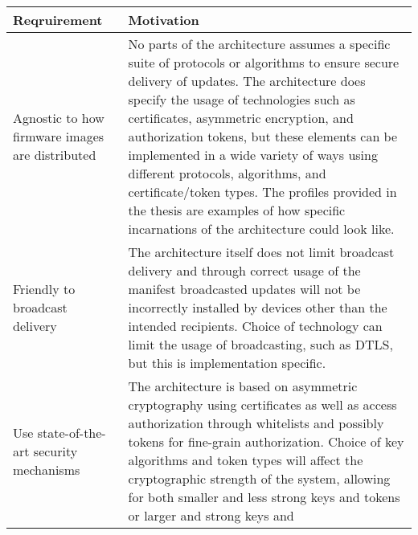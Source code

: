 \begin{longtable}[]{@{}ll@{}}
\toprule
\begin{minipage}[b]{0.41\columnwidth}\raggedright\strut
Reqruirement\strut
\end{minipage} & \begin{minipage}[b]{0.53\columnwidth}\raggedright\strut
Motivation\strut
\end{minipage}\tabularnewline
\midrule
\endhead
\begin{minipage}[t]{0.41\columnwidth}\raggedright\strut
Agnostic to how firmware images are distributed\strut
\end{minipage} & \begin{minipage}[t]{0.53\columnwidth}\raggedright\strut
No parts of the architecture assumes a specific suite of protocols or
algorithms to ensure secure delivery of updates. The architecture does
specify the usage of technologies such as certificates, asymmetric
encryption, and authorization tokens, but these elements can be
implemented in a wide variety of ways using different protocols,
algorithms, and certificate/token types. The profiles provided in the
thesis are examples of how specific incarnations of the architecture
could look like.\strut
\end{minipage}\tabularnewline
\begin{minipage}[t]{0.41\columnwidth}\raggedright\strut
Friendly to broadcast delivery\strut
\end{minipage} & \begin{minipage}[t]{0.53\columnwidth}\raggedright\strut
The architecture itself does not limit broadcast delivery and through
correct usage of the manifest broadcasted updates will not be
incorrectly installed by devices other than the intended recipients.
Choice of technology can limit the usage of broadcasting, such as DTLS,
but this is implementation specific.\strut
\end{minipage}\tabularnewline
\begin{minipage}[t]{0.41\columnwidth}\raggedright\strut
Use state-of-the-art security mechanisms\strut
\end{minipage} & \begin{minipage}[t]{0.53\columnwidth}\raggedright\strut
The architecture is based on asymmetric cryptography using certificates
as well as access authorization through whitelists and possibly tokens
for fine-grain authorization. Choice of key algorithms and token types
will affect the cryptographic strength of the system, allowing for both
smaller and less strong keys and tokens or larger and strong keys and

\end{minipage}
\end{longtable}
